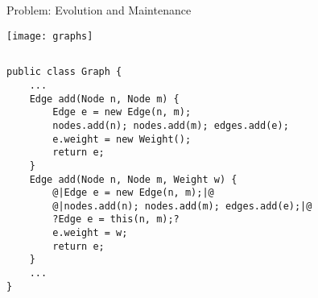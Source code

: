 \begin{frame}[fragile]{Problem: Evolution and Maintenance}
	\vspace{-1.7cm}
	\begin{flushright}		
		\texttt{[image: graphs]}
	\end{flushright}
	\vspace{0.1cm}
	\begin{tiny}
		\begin{columns}
				\vspace{-12mm}
\vspace{3mm}					
\begin{lstlisting}
public class Graph {
	...
	Edge add(Node n, Node m) {
		Edge e = new Edge(n, m);
		nodes.add(n); nodes.add(m); edges.add(e);
		e.weight = new Weight();
		return e;
	}
	Edge add(Node n, Node m, Weight w) {
		@|Edge e = new Edge(n, m);|@
		@|nodes.add(n); nodes.add(m); edges.add(e);|@
		?Edge e = this(n, m);?	
		e.weight = w;
		return e;
	}
	...
}
\end{lstlisting}	
				\vspace{2mm}
		\end{columns}
	\end{tiny}
\end{frame}

